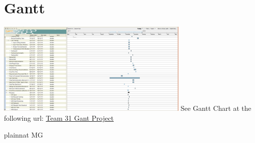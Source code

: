 \documentclass[12pt, titlepage]{article}
\begin{document}
\section{Gantt}
\centering
\includegraphics[width=0.7\textwidth]{gantt.png}
\newline
	See Gantt Chart at the following url: \href{https://gitlab.cas.mcmaster.ca/myersd1/3xa3-team31/blob/master/ProjectSchedule/Team%2031%20Gantt%20Project.pdf}{Team 31 Gant Project}

 {plainnat}
 {MG}
\end{document}
